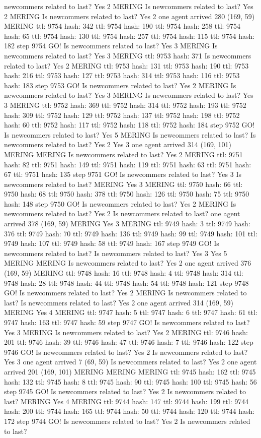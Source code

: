 newcommers related to last? Yes 2 MERING Is newcommers related to last? Yes 2 MERING Is newcommers related to last? Yes 2 one agent arrived 280 (169, 59) MERING ttl: 9754 hash: 342 ttl: 9754 hash: 190 ttl: 9754 hash: 258 ttl: 9754 hash: 65 ttl: 9754 hash: 130 ttl: 9754 hash: 257 ttl: 9754 hash: 115 ttl: 9754 hash: 182 step 9754 GO! Is newcommers related to last? Yes 3 MERING Is newcommers related to last? Yes 3 MERING ttl: 9753 hash: 371 Is newcommers related to last? Yes 2 MERING ttl: 9753 hash: 131 ttl: 9753 hash: 190 ttl: 9753 hash: 216 ttl: 9753 hash: 127 ttl: 9753 hash: 314 ttl: 9753 hash: 116 ttl: 9753 hash: 183 step 9753 GO! Is newcommers related to last? Yes 2 MERING Is newcommers related to last? Yes 3 MERING Is newcommers related to last? Yes 3 MERING ttl: 9752 hash: 369 ttl: 9752 hash: 314 ttl: 9752 hash: 193 ttl: 9752 hash: 309 ttl: 9752 hash: 129 ttl: 9752 hash: 137 ttl: 9752 hash: 198 ttl: 9752 hash: 60 ttl: 9752 hash: 117 ttl: 9752 hash: 118 ttl: 9752 hash: 184 step 9752 GO! Is newcommers related to last? Yes 5 MERING Is newcommers related to last? Is newcommers related to last? Yes 2 Yes 3 one agent arrived 314 (169, 101) MERING MERING Is newcommers related to last? Yes 2 MERING ttl: 9751 hash: 82 ttl: 9751 hash: 149 ttl: 9751 hash: 119 ttl: 9751 hash: 63 ttl: 9751 hash: 67 ttl: 9751 hash: 135 step 9751 GO! Is newcommers related to last? Yes 3 Is newcommers related to last? MERING Yes 3 MERING ttl: 9750 hash: 66 ttl: 9750 hash: 68 ttl: 9750 hash: 378 ttl: 9750 hash: 126 ttl: 9750 hash: 75 ttl: 9750 hash: 148 step 9750 GO! Is newcommers related to last? Yes 2 MERING Is newcommers related to last? Yes 2 Is newcommers related to last? one agent arrived 378 (169, 59) MERING Yes 3 MERING ttl: 9749 hash: 3 ttl: 9749 hash: 376 ttl: 9749 hash: 70 ttl: 9749 hash: 136 ttl: 9749 hash: 99 ttl: 9749 hash: 101 ttl: 9749 hash: 107 ttl: 9749 hash: 58 ttl: 9749 hash: 167 step 9749 GO! Is newcommers related to last? Is newcommers related to last? Yes 3 Yes 5 MERING MERING Is newcommers related to last? Yes 2 one agent arrived 376 (169, 59) MERING ttl: 9748 hash: 16 ttl: 9748 hash: 4 ttl: 9748 hash: 314 ttl: 9748 hash: 28 ttl: 9748 hash: 44 ttl: 9748 hash: 54 ttl: 9748 hash: 121 step 9748 GO! Is newcommers related to last? Yes 2 MERING Is newcommers related to last? Is newcommers related to last? Yes 2 one agent arrived 314 (169, 59) MERING Yes 4 MERING ttl: 9747 hash: 5 ttl: 9747 hash: 6 ttl: 9747 hash: 61 ttl: 9747 hash: 163 ttl: 9747 hash: 59 step 9747 GO! Is newcommers related to last? Yes 3 MERING Is newcommers related to last? Yes 2 MERING ttl: 9746 hash: 201 ttl: 9746 hash: 39 ttl: 9746 hash: 47 ttl: 9746 hash: 7 ttl: 9746 hash: 122 step 9746 GO! Is newcommers related to last? Yes 2 Is newcommers related to last? Yes 3 one agent arrived 7 (69, 59) Is newcommers related to last? Yes 2 one agent arrived 201 (169, 101) MERING MERING MERING ttl: 9745 hash: 162 ttl: 9745 hash: 132 ttl: 9745 hash: 8 ttl: 9745 hash: 90 ttl: 9745 hash: 100 ttl: 9745 hash: 56 step 9745 GO! Is newcommers related to last? Yes 2 Is newcommers related to last? MERING Yes 4 MERING ttl: 9744 hash: 147 ttl: 9744 hash: 199 ttl: 9744 hash: 200 ttl: 9744 hash: 165 ttl: 9744 hash: 50 ttl: 9744 hash: 120 ttl: 9744 hash: 172 step 9744 GO! Is newcommers related to last? Yes 2 Is newcommers related to last? 